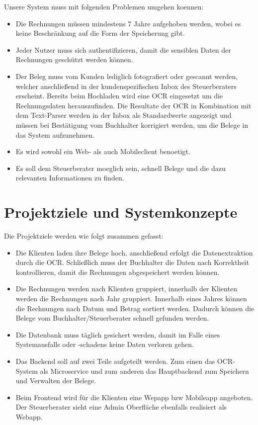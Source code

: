 \documentclass[12pt]{article}
\theoremstyle{definition}
\begin{document}
Unsere System muss mit folgenden Problemen umgehen koennen:
\begin{itemize}
\item Die Rechnungen müssen mindestens 7 Jahre aufgehoben werden, wobei es keine Beschränkung auf die Form der Speicherung gibt.
\item Jeder Nutzer muss sich authentifizieren, damit die sensiblen Daten der Rechnungen geschützt werden können.
\item Der Beleg muss vom Kunden lediglich fotografiert oder gescannt werden, welcher anschließend in der kundenspezifischen Inbox des Steuerberaters erscheint. Bereits beim Hochladen wird eine OCR eingesetzt um die Rechnungsdaten herauszufinden. Die Resultate der OCR in Kombination mit dem Text-Parser werden in der Inbox als Standardwerte angezeigt und müssen bei Bestätigung vom Buchhalter korrigiert werden, um die Belege in das System aufzunehmen.
\item Es wird sowohl ein Web- als auch Mobileclient benoetigt.
\item Es soll dem Steuerberater moeglich sein, schnell Belege und die dazu relevanten Informationen zu finden.
\end{itemize}

\pagebreak

\section{Projektziele und Systemkonzepte}
Die Projektziele werden wie folgt zusammen gefasst:
\begin{itemize}
\item Die Klienten laden ihre Belege hoch, anschließend erfolgt die Datenextraktion durch die OCR. Schließlich muss der Buchhalter die Daten nach Korrektheit kontrollieren, damit
die Rechnungen abgespeichert werden können.
\item Die Rechnungen werden nach Klienten gruppiert, innerhalb der Klienten werden die Rechnungen nach Jahr gruppiert. Innerhalb eines Jahres können die Rechnungen nach Datum und Betrag sortiert werden.
Dadurch können die Belege vom Buchhalter/Steuerberater schnell gefunden werden.
\item Die Datenbank muss täglich gesichert werden, damit im Falle eines Systemausfalls oder -schadens keine Daten verloren gehen. 
\item Das Backend soll auf zwei Teile aufgeteilt werden. Zum einen das OCR- System als Microservice und zum anderen das Hauptbackend zum Speichern und Verwalten der Belege.
\item Beim Frontend wird für die Klienten eine Wepapp bzw Mobileapp angeboten. Der Steuerberater sieht eine Admin Oberfläche ebenfalls realisiert als Webapp.
\end{itemize}
\end{document}
